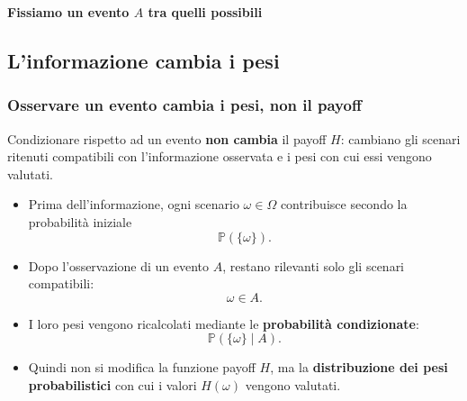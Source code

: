 \documentclass[handout]{beamer}%
\newenvironment{stepitemize}{\begin{itemize}[<+->]}{\end{itemize} }
\providecommand{\Prob}{\mathbb{P}}
\providecommand{\1}{\mathbf{1}}
\providecommand{\QTR}[2]{\csname #1\endcsname{#2}}
\begin{document}
\begin{frame}%



\vfill


\begin{center}
\textcolor{light-blue}{{\Large \textbf{Fissiamo un evento $A$ tra quelli possibili}}}
\end{center}

\vfill
%

\transboxout
\end{frame}%




\subsection{L'informazione cambia i pesi}%

\begin{frame}%
\frametitle{Osservare un evento cambia i pesi, non il payoff}%


Condizionare rispetto ad un evento \textbf{non cambia} il payoff $H$: cambiano
gli scenari ritenuti compatibili con l'informazione osservata e i pesi con cui
essi vengono valutati.

\medskip

\begin{stepitemize}
\item Prima dell'informazione, ogni scenario $\omega\in\Omega$ contribuisce
secondo la probabilit\`{a} iniziale
\[
\Prob(\{\omega\}).
\]


\item Dopo l'osservazione di un evento $A$, restano rilevanti solo gli scenari
compatibili:
\[
\omega\in A.
\]


\item I loro pesi vengono ricalcolati mediante le \textbf{probabilit\`{a}
condizionate}:
\[
\Prob(\{\omega\}\mid A).
\]


\item Quindi non si modifica la funzione payoff $H$, ma la
\textbf{distribuzione dei pesi probabilistici} con cui i valori $H(\omega)$
vengono valutati.
\end{stepitemize}%

\transboxout
\end{frame}%
\end{document}
